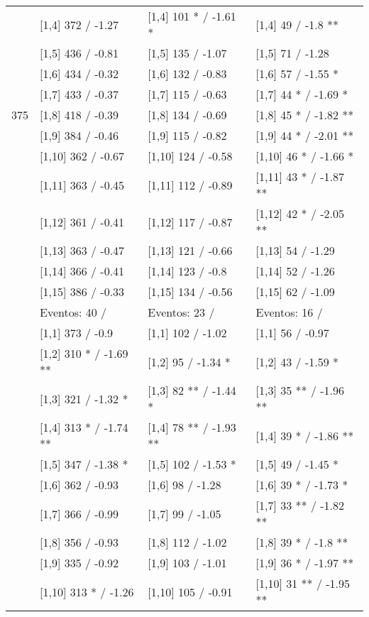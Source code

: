 \begin{table}
\begin{tabular}[t]{llll}
\addlinespace
 & {}[1,4] 372  / -1.27 & {}[1,4] 101 * / -1.61 * & {}[1,4] 49  / -1.8 **\\
 & {}[1,5] 436  / -0.81 & {}[1,5] 135  / -1.07 & {}[1,5] 71  / -1.28\\
 & {}[1,6] 434  / -0.32 & {}[1,6] 132  / -0.83 & {}[1,6] 57  / -1.55 *\\
 & {}[1,7] 433  / -0.37 & {}[1,7] 115  / -0.63 & {}[1,7] 44 * / -1.69 *\\
375 & {}[1,8] 418  / -0.39 & {}[1,8] 134  / -0.69 & {}[1,8] 45 * / -1.82 **\\
\addlinespace
 & {}[1,9] 384  / -0.46 & {}[1,9] 115  / -0.82 & {}[1,9] 44 * / -2.01 **\\
 & {}[1,10] 362  / -0.67 & {}[1,10] 124  / -0.58 & {}[1,10] 46 * / -1.66 *\\
 & {}[1,11] 363  / -0.45 & {}[1,11] 112  / -0.89 & {}[1,11] 43 * / -1.87 **\\
 & {}[1,12] 361  / -0.41 & {}[1,12] 117  / -0.87 & {}[1,12] 42 * / -2.05 **\\
 & {}[1,13] 363  / -0.47 & {}[1,13] 121  / -0.66 & {}[1,13] 54  / -1.29\\
\addlinespace
 & {}[1,14] 366  / -0.41 & {}[1,14] 123  / -0.8 & {}[1,14] 52  / -1.26\\
 & {}[1,15] 386  / -0.33 & {}[1,15] 134  / -0.56 & {}[1,15] 62  / -1.09\\
 & Eventos:  40 / & Eventos:  23 / & Eventos:  16 /\\
 & {}[1,1] 373  / -0.9 & {}[1,1] 102  / -1.02 & {}[1,1] 56  / -0.97\\
 & {}[1,2] 310 * / -1.69 ** & {}[1,2] 95  / -1.34 * & {}[1,2] 43  / -1.59 *\\
\addlinespace
 & {}[1,3] 321  / -1.32 * & {}[1,3] 82 ** / -1.44 * & {}[1,3] 35 ** / -1.96 **\\
 & {}[1,4] 313 * / -1.74 ** & {}[1,4] 78 ** / -1.93 ** & {}[1,4] 39 * / -1.86 **\\
 & {}[1,5] 347  / -1.38 * & {}[1,5] 102  / -1.53 * & {}[1,5] 49  / -1.45 *\\
 & {}[1,6] 362  / -0.93 & {}[1,6] 98  / -1.28 & {}[1,6] 39 * / -1.73 *\\
 & {}[1,7] 366  / -0.99 & {}[1,7] 99  / -1.05 & {}[1,7] 33 ** / -1.82 **\\
\addlinespace
500 & {}[1,8] 356  / -0.93 & {}[1,8] 112  / -1.02 & {}[1,8] 39 * / -1.8 **\\
 & {}[1,9] 335  / -0.92 & {}[1,9] 103  / -1.01 & {}[1,9] 36 * / -1.97 **\\
 & {}[1,10] 313 * / -1.26 & {}[1,10] 105  / -0.91 & {}[1,10] 31 ** / -1.95 **\\

\end{tabular}
\end{table}
